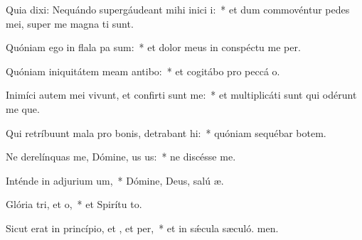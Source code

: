 \item Quia dixi: Nequándo supergáudeant mihi inici i:~* et dum commovéntur pedes mei, super me magna ti sunt.
\item Quóniam ego in flala pa sum:~* et dolor meus in conspéctu me per.
\item Quóniam iniquitátem meam antibo:~* et cogitábo pro peccá o.
\item Inimíci autem mei vivunt, et confirti sunt  me:~* et multiplicáti sunt qui odérunt me que.
\item Qui retríbuunt mala pro bonis, detrabant hi:~* quóniam sequébar botem.
\item Ne derelínquas me, Dómine, us us:~* ne discésse  me.
\item Inténde in adjurium um,~* Dómine, Deus, salú æ.
\item Glória tri, et o,~* et Spirítu to.
\item Sicut erat in princípio, et , et per,~* et in sǽcula sæculó. men.
